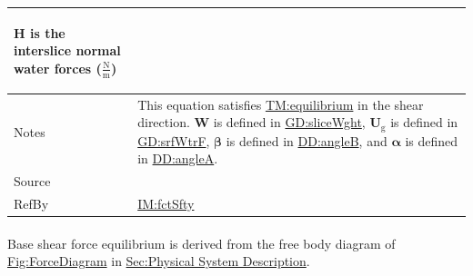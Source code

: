 \documentclass[12pt]{article}
\begin{document}
\begin{minipage}{\textwidth}
\begin{tabular}{>{\raggedright}p{}>{\raggedright\arraybackslash}p{}}
\begin{symbDescription}
              \item{$\symbf{H}$ is the interslice normal water forces ($\frac{\text{N}}{\text{m}}$)}
              \end{symbDescription}
\\ \midrule
Notes & This equation satisfies \hyperref[TM:equilibrium]{TM:equilibrium} in the shear direction. $\symbf{W}$ is defined in \hyperref[GD:sliceWght]{GD:sliceWght}, ${\symbf{U}_{\text{g}}}$ is defined in \hyperref[GD:srfWtrF]{GD:srfWtrF}, $\symbf{β}$ is defined in \hyperref[DD:angleB]{DD:angleB}, and $\symbf{α}$ is defined in \hyperref[DD:angleA]{DD:angleA}.
        
\\ \midrule
Source & \cite{chen2005}
         
\\ \midrule
RefBy & \hyperref[IM:fctSfty]{IM:fctSfty}
        
\\ \bottomrule
\end{tabular}
\end{minipage}

\paragraph{}
\label{GD:bsShrFEqDeriv}
Base shear force equilibrium is derived from the free body diagram of \hyperref[Figure:ForceDiagram]{Fig:ForceDiagram} in \hyperref[Sec:PhysSyst]{Sec:Physical System Description}.
\end{document}
